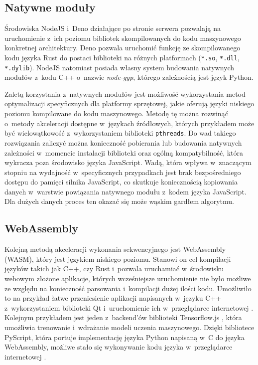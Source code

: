 \subsection{Natywne moduły}

Środowiska NodeJS i~Deno działające po stronie serwera pozwalają na uruchomienie z~ich poziomu bibliotek skompilowanych do kodu maszynowego konkretnej architektury. Deno pozwala uruchomić funkcję ze skompilowanego kodu języka Rust do postaci biblioteki na różnych platformach (\lstinline{*.so}, \lstinline{*.dll}, \lstinline{*.dylib}). NodeJS natomiast posiada własny system budowania natywnych modułów z~kodu C++ o~nazwie \textit{node-gyp}, którego zależnością jest język Python.

Zaletą korzystania z~natywnych modułów jest możliwość wykorzystania metod optymalizacji specyficznych dla platformy sprzętowej, jakie oferują języki niskiego poziomu kompilowane do kodu maszynowego. Metodę tę można rozwinąć o~metody akceleracji dostępne w~językach źródłowych, których przykładem może być wielowątkowość z~wykorzystaniem biblioteki \lstinline{pthreads}. Do wad takiego rozwiązania zaliczyć można konieczność pobierania lub budowania natywnych zależności w~momencie instalacji biblioteki oraz ogólną kompatybilność, która wykracza poza środowisko języka JavaScript. Wadą, która wpływa w~znaczącym stopniu na wydajność w~specyficznych przypadkach jest brak bezpośredniego dostępu do pamięci silnika JavaScript, co skutkuje koniecznością kopiowania danych w~warstwie powiązania natywnego modułu z~kodem języka JavaScript. Dla dużych danych proces ten okazać się może wąskim gardłem algorytmu.

\subsection{WebAssembly}

Kolejną metodą akceleracji wykonania sekwencyjnego jest WebAssembly (WASM), który jest językiem niskiego poziomu. Stanowi on cel kompilacji języków takich jak C++, czy Rust i~pozwala uruchamiać w~środowisku webowym złożone aplikacje, których wcześniejsze uruchomienie nie było możliwe ze względu na konieczność parsowania i~kompilacji dużej ilości kodu. Umożliwiło to na przykład łatwe przeniesienie aplikacji napisanych w~języku C++ z~wykorzystaniem biblioteki Qt i~uruchomienie ich w~przeglądarce internetowej \cite{qt-wasm}. Kolejnym przykładem jest jeden z~backend'ów biblioteki Tensorflow.js \cite{tensorflowjs}, która umożliwia trenowanie i~wdrażanie modeli uczenia maszynowego. Dzięki bibliotece PyScript, która portuje implementację języka Python napisaną w~C do języka WebAssembly, możliwe stało się wykonywanie kodu języka w~przeglądarce internetowej \cite{pyscript}.


